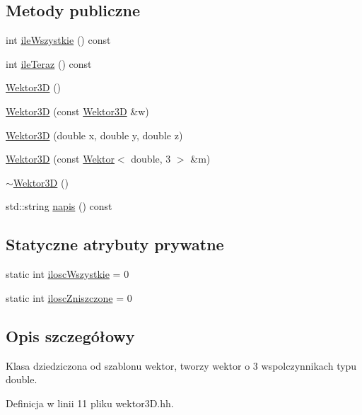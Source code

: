 \subsection*{Metody publiczne}
\begin{DoxyCompactItemize}
\item 
int \mbox{\hyperlink{class_wektor3_d_a93099f705273022e5c857dba3730d750}{ile\+Wszystkie}} () const
\item 
int \mbox{\hyperlink{class_wektor3_d_a35bade70d5d9200b5e4fab3e7726f4c8}{ile\+Teraz}} () const
\item 
\mbox{\hyperlink{class_wektor3_d_a7c48a57fd36c0af29e26c825f90a973f}{Wektor3D}} ()
\item 
\mbox{\hyperlink{class_wektor3_d_a2768524be9d9728b362f6bb9b42d333a}{Wektor3D}} (const \mbox{\hyperlink{class_wektor3_d}{Wektor3D}} \&w)
\item 
\mbox{\hyperlink{class_wektor3_d_a0defc77d38b1c9f9b1063d2b3459de5c}{Wektor3D}} (double x, double y, double z)
\item 
\mbox{\hyperlink{class_wektor3_d_a2214f63869d47df6ef839b4c21fc7ec5}{Wektor3D}} (const \mbox{\hyperlink{class_wektor}{Wektor}}$<$ double, 3 $>$ \&m)
\item 
\mbox{\hyperlink{class_wektor3_d_af82ae24a30f6c4391edd67647348ac04}{$\sim$\+Wektor3D}} ()
\item 
std\+::string \mbox{\hyperlink{class_wektor3_d_ac331c1650351545bc6f765c63b60ff65}{napis}} () const
\end{DoxyCompactItemize}
\subsection*{Statyczne atrybuty prywatne}
\begin{DoxyCompactItemize}
\item 
static int \mbox{\hyperlink{class_wektor3_d_a2e8ba0afae88b1441e22d7788cc3a651}{ilosc\+Wszystkie}} = 0
\item 
static int \mbox{\hyperlink{class_wektor3_d_aceae8a0d97d25a838ec509288c5b6cc5}{ilosc\+Zniszczone}} = 0
\end{DoxyCompactItemize}


\subsection{Opis szczegółowy}
Klasa dziedziczona od szablonu wektor, tworzy wektor o 3 wspolczynnikach typu double. 

Definicja w linii 11 pliku wektor3\+D.\+hh.



